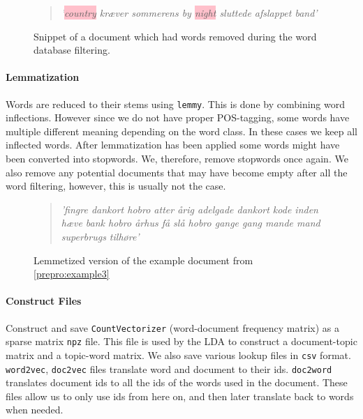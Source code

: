 \begin{figure}[h]
	\begin{quote}
		\textit{
			'\colorbox{pink}{country} kræver sommerens by \colorbox{pink}{night} sluttede afslappet band'
		}
	\end{quote}
	\caption{Snippet of a document which had words removed during the word database filtering.}
	\label{prepro:example4}
\end{figure}

\paragraph{Lemmatization}
Words are reduced to their stems using \texttt{lemmy}. 
This is done by combining word inflections.
However since we do not have proper POS-tagging, some words have multiple different meaning depending on the word class. In these cases we keep all inflected words.
After lemmatization has been applied some words might have been converted into stopwords.
We, therefore, remove stopwords once again.
We also remove any potential documents that may have become empty after all the word filtering, however, this is usually not the case.
\begin{figure}[h]
	\begin{quote}
		\textit{
			'fingre dankort hobro atter årig adelgade dankort kode inden hæve bank hobro århus få slå hobro gange gang mande mand superbrugs tilhøre'
		}
	\end{quote}
	\caption{Lemmetized version of the example document from \autoref{prepro:example3}}
	\label{prepro:example5}
\end{figure}

\paragraph{Construct Files}
Construct and save \texttt{CountVectorizer} (word-document frequency matrix) as a sparse matrix \texttt{npz} file. This file is used by the LDA to construct a document-topic matrix and a topic-word matrix.
We also save various lookup files in \texttt{csv} format. \texttt{word2vec}, \texttt{doc2vec} files translate word and document to their ids.
\texttt{doc2word} translates document ids to all the ids of the words used in the document.
These files allow us to only use ids from here on, and then later translate back to words when needed.


